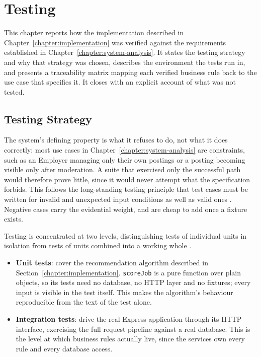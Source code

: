 
\chapter{Testing}
\label{chapter:testing}

This chapter reports how the implementation described in Chapter~\ref{chapter:implementation} was verified against the requirements established in Chapter~\ref{chapter:system-analysis}. It states the testing strategy and why that strategy was chosen, describes the environment the tests run in, and presents a traceability matrix mapping each verified business rule back to the use case that specifies it. It closes with an explicit account of what was not tested.

\section{Testing Strategy}

The system's defining property is what it refuses to do, not what it does correctly: most use cases in Chapter~\ref{chapter:system-analysis} are constraints, such as an Employer managing only their own postings or a posting becoming visible only after moderation. A suite that exercised only the successful path would therefore prove little, since it would never attempt what the specification forbids. This follows the long-standing testing principle that test cases must be written for invalid and unexpected input conditions as well as valid ones \cite{myers2011testing}. Negative cases carry the evidential weight, and are cheap to add once a fixture exists.

Testing is concentrated at two levels, distinguishing tests of individual units in isolation from tests of units combined into a working whole \cite{myers2011testing}.
\begin{itemize}
	\item \textbf{Unit tests}: cover the recommendation algorithm described in Section~\ref{chapter:implementation}. \texttt{scoreJob} is a pure function over plain objects, so its tests need no database, no HTTP layer and no fixtures; every input is visible in the test itself. This makes the algorithm's behaviour reproducible from the text of the test alone.
	\item \textbf{Integration tests}: drive the real Express application through its HTTP interface, exercising the full request pipeline against a real database. This is the level at which business rules actually live, since the services own every rule and every database access.
\end{itemize}

